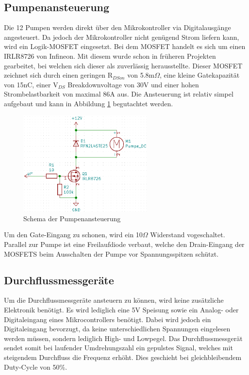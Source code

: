 \newpage
\subsection{Pumpenansteuerung}
\label{subsec:Detailkonzept_Pumpenansteuerung}

Die 12 Pumpen werden direkt über den Mikrokontroller via Digitalausgänge angesteuert. Da jedoch der Mikrokontroller nicht genügend Strom liefern kann, wird ein Logik-MOSFET eingesetzt. Bei dem MOSFET handelt es sich um einen IRLR8726 von Infineon. Mit diesem wurde schon in früheren Projekten gearbeitet, bei welchen sich dieser als zuverlässig herausstellte. Dieser MOSFET zeichnet sich durch einen geringen R$_{DSon}$ von 5.8m$\Omega$, eine kleine Gatekapazität von 15nC, einer V$_{DS}$ Breakdownvoltage von 30V und einer hohen Strombelastbarkeit von maximal 86A aus. Die Ansteuerung ist relativ simpel aufgebaut und kann in Abbildung \ref{fig:Pumpenansteuerung} begutachtet werden. 

\begin{figure}[h!]
\centering
\includegraphics[width=0.6\textwidth]{graphics/Pumpenansteuerung.png}
\caption{Schema der Pumpenansteuerung}
\label{fig:Pumpenansteuerung}
\end{figure} 

Um den Gate-Eingang zu schonen, wird ein 10$\Omega$ Widerstand vogeschaltet. Parallel zur Pumpe ist eine Freilaufdiode verbaut, welche den Drain-Eingang der MOSFETS beim Ausschalten der Pumpe vor Spannungsspitzen schützt. 

\subsection{Durchflussmessgeräte}
\label{subsec:Detailkonzept_Durchflussmessgeräte}

Um die Durchflussmessgeräte ansteuern zu können, wird keine zusätzliche Elektronik benötigt. Es wird lediglich eine 5V Speisung sowie ein Analog- oder Digitaleingang eines Mikrocontrollers benötigt. Dabei wird jedoch ein Digitaleingang bevorzugt, da keine unterschiedlichen Spannungen eingelesen werden müssen, sondern lediglich High- und Lowpegel. Das Durchflussmessgerät sendet somit bei laufender Umdrehungszahl ein gepulstes Signal, welches mit steigendem Durchfluss die Frequenz erhöht. Dies geschieht bei gleichbleibendem Duty-Cycle von 50\%.